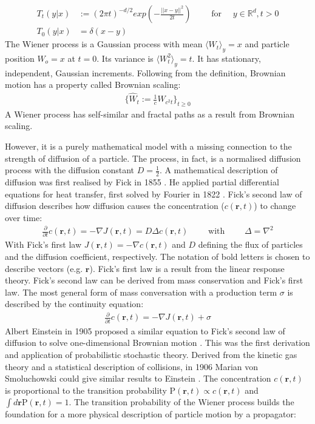 \documentclass[
  a4paper,BCOR10mm,twoside,
  headsepline,footsepline,%
  fleqn,openbib
]{scrbook}
\begin{document}
\begin{align}
T_{t}(y|x) & := (2 \pi t)^{-d/2} exp \left(- \frac{||x-y||^2}{2 t}\right) \qquad  \text{ for } \quad y \in \mathbb{R}^d, t>0 \\ \nonumber
T_{0}(y|x) & = \delta(x-y) 
\end{align}
The Wiener process is a Gaussian process with mean $\langle W_t \rangle_y=x$ and particle position $W_o=x$ at $t=0$. Its variance is $\langle W^2_t \rangle_y= t$. It has stationary, independent, Gaussian increments. Following from the definition, Brownian motion has a property called Brownian scaling:
\begin{align}
\label{Brownianscaling}
\{\hat{W}_t := \frac{1}{c} W_{c^2 t} \}_{t\geq0} 
\end{align}
A Wiener process has self-similar and fractal paths as a result from Brownian scaling.\par\bigskip
However, it is a purely mathematical model with a missing connection to the strength of diffusion of a particle. The process, in fact, is a normalised diffusion process with the diffusion constant $D=\frac{1}{2}$. A mathematical description of diffusion was first realised by Fick in 1855 \cite{Fick1855}. He applied partial differential equations for heat transfer, first solved by Fourier in 1822 \cite{Fourier1822}. Fick's  second law of diffusion describes how diffusion causes the concentration ($c(\bm{r},t)$) to change over time:
\begin{align}
 \frac{\partial}{\partial t} c(\bm{r},t) = - \nabla J (\bm{r},t) = D  \Delta c(\bm{r},t) \qquad \text{ with } \qquad \Delta= \nabla^2  \label{eq:ficks}
\end{align}
With Fick's first law $J(\bm{r},t)=- \nabla c(\bm{r},t)$ and $D$ defining the flux of particles and the diffusion coefficient, respectively. The notation of bold letters is chosen to describe vectors (e.g. $\bm{r}$). Fick's first law is a result from the linear response theory. Fick's second law can be derived from mass conservation and Fick's first law. The most general form of mass conversation with a production term $\sigma$ is described by the continuity equation:
\begin{align} \label{continuity}
\frac{\partial}{\partial t} c(\bm{r},t)=- \nabla J(\bm{r},t)+ \sigma 
\end{align}
Albert Einstein in 1905 proposed a similar equation to Fick's second law of diffusion to solve one-dimensional Brownian motion \cite{Einstein1905}. This was the first derivation and application of probabilistic stochastic theory. Derived from the kinetic gas theory and a statistical description of collisions, in 1906 Marian von Smoluchowski could give similar results to Einstein \cite{vonSmoluchowski1906}. The concentration $c(\bm{r},t)$ is proportional to the transition probability $\mathrm{P}(\bm{r},t) \propto c(\bm{r},t)$ and  $\int d\bm{r}\mathrm{P}(\bm{r},t)=1$. The transition probability of the Wiener process builds the foundation for a more physical description of particle motion by a propagator:
\end{document}
